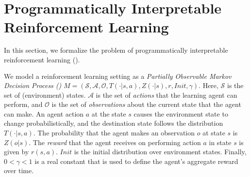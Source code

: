 \section{Programmatically Interpretable Reinforcement Learning}
\label{sec:sygurl}

In this section, we formalize the problem of programmatically interpretable reinforcement learning (\sygurl). 

\newcommand{\Cals}{\mathcal{S}}
\newcommand{\A}{\mathcal{A}}
\newcommand{\ra}{\rightarrow}
\newcommand{\T}{\mathcal{T}}
\newcommand{\Lang}{\mathcal{L}}
\newcommand{\sem}[1]{[\![#1]\!]}
\newcommand{\Prob}{\mathbf{Pr}}
\newcommand{\Expec}{\mathbf{E}}
\newcommand{\Policies}{\mathcal{P}}
\newcommand{\Observ}{\mathcal{O}}
\newcommand{\Init}{\mathit{Init}}
\newcommand{\Op}{\mathit{Ops}}
\renewcommand{\S}{\mathcal{S}}


\newcommand{\combinec}{\mathbf{combine}}
\newcommand{\op}{\oplus}

\newcommand{\mapc}{\mathbf{map}}
\newcommand{\filterc}{\mathbf{filter}}
\newcommand{\headc}{\mathbf{hd}}
\newcommand{\tailc}{\mathbf{tl}}
\newcommand{\pickc}{\mathbf{peek}}

\newcommand{\hole}{\chi}

\newcommand{\ifc}{\mathbf{if}}
\newcommand{\letc}{\mathbf{let}}
\newcommand{\thenc}{\mathbf{then}}
\newcommand{\pushc}{\mathbf{push}}
\newcommand{\alphac}{x}

\newcommand{\elsec}{\mathbf{else}}
\newcommand{\foldc}{\mathbf{fold}}
\newcommand{\orc}{\mathbf{or}}
\newcommand{\andc}{\mathbf{and}}
\newcommand{\Action}{\mathit{Action}}
\newcommand{\Obs}{\mathit{Obs}}
\newcommand{\Accel}{\mathit{Accel}}
\newcommand{\latest}{\mathtt{Latest}}
\newcommand{\previous}{\mathtt{Previous}}
\newcommand{\rpm}{\mathtt{RPM}}
\newcommand{\tangle}{\mathtt{TrackPos}}
\newcommand{\Param}{\mathit{Param}}



We model a reinforcement learning setting as a {\em Partially Observable Markov Decision Process (\pomdp)} $M = (\Cals, \A, \Observ, T(\cdot | s, a), Z(\cdot | s), r, \Init, \gamma)$. Here, $\Cals$ is the set of {(environment) states}. $\A$ is the set of {\em actions} that the learning agent can perform, and $\Observ$ is the set of {\em observations} about the current state that the agent can make. An agent action $a$ at the state $s$ causes the environment state to change probabilistically, and the destination state follows the distribution $T(\cdot | s, a)$. The probability that the agent makes an observation $o$ at state $s$ is $Z(o | s)$. The {\em reward} that the agent receives on performing action $a$ in state $s$ is given by $r(s, a)$.  $\Init$ is the {initial distribution} over environment states.  Finally, $0 < \gamma < 1$ is a real constant that is used to define the agent's aggregate reward over time.

